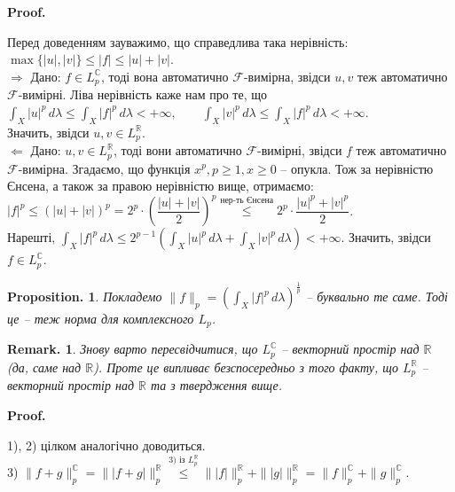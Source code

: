 \documentclass[a4paper, 10pt]{article}
\makeatletter
\def\rightproof{$\boxed{\Rightarrow}$ }
\def\leftproof{$\boxed{\Leftarrow}$ }
\theoremstyle{theoremdd}
\newtheorem*{proposition*}{Proposition.}
\newtheorem*{remark*}{Remark.}
\renewenvironment{proof}[1][Proof.\\]{\par
\pushQED{\hfill \qed}%
\normalfont \topsep6\p@\@plus6\p@\relax
\trivlist
\item\relax
{\bfseries
#1\@addpunct{.}}\hspace\labelsep\ignorespaces
}{%
\popQED\endtrivlist\@endpefalse
}
\makeatother
\begin{document}
\begin{proof}
Перед доведенням зауважимо, що справедлива така нерівність: $\max\{|u|,|v|\} \leq |f| \leq |u| + |v|$.
\bigskip \\
\rightproof Дано: $f \in L_p^{\mathbb{C}}$, тоді вона автоматично $\mathcal{F}$-вимірна, звідси $u,v$ теж автоматично $\mathcal{F}$-вимірні. Ліва нерівність каже нам про те, що\\
$\displaystyle\int_X |u|^p\,d\lambda \leq \int_X |f|^p\,d\lambda < +\infty, \qquad \int_X |v|^p\,d\lambda \leq \int_X |f|^p\,d\lambda < +\infty$.\\
Значить, звідси $u,v \in L_p^{\mathbb{R}}$.
\bigskip \\
\leftproof Дано: $u,v \in L_p^{\mathbb{R}}$, тоді вони автоматично $\mathcal{F}$-вимірні, звідси $f$ теж автоматично $\mathcal{F}$-вимірна. Згадаємо, що функція $x^p, p \geq 1,x \geq 0$ -- опукла. Тож за нерівністю Єнсена, а також за правою нерівністю вище, отримаємо:\\
$|f|^p \leq (|u| + |v|)^p = 2^p \cdot \left( \dfrac{|u| + |v|}{2} \right)^p \overset{\text{нер-ть Єнсена}}{\leq} 2^p \cdot \dfrac{|u|^p + |v|^p}{2}$.\\
Нарешті, $\displaystyle\int_X |f|^p\,d\lambda \leq 2^{p-1} \left( \int_X |u|^p\,d\lambda + \int_X |v|^p\,d\lambda \right) < +\infty$. Значить, звідси $f \in L_p^{\mathbb{C}}$.
\end{proof}

\begin{proposition*}
Покладемо $\|f\|_p = \displaystyle \left( \int_X |f|^p\,d\lambda \right)^{\frac{1}{p}}$ -- буквально те саме. Тоді це -- теж норма для комплексного $L_p$.
\end{proposition*}

\begin{remark*}
Знову варто пересвідчитися, що $L_p^{\mathbb{C}}$ -- векторний простір над $\mathbb{R}$ (да, саме над $\mathbb{R}$). Проте це випливає безспосередньо з того факту, що $L_p^{\mathbb{R}}$ -- векторний простір над $\mathbb{R}$ та з твердження вище.
\end{remark*}

\begin{proof}
1), 2) цілком аналогічно доводиться.\\
3) $\|f+g\|_p^{\mathbb{C}} = \| |f+g| \|_p^{\mathbb{R}} \overset{\text{3) із } L_p^{\mathbb{R}}}{\leq} \| |f| \|_p^{\mathbb{R}} + \| |g| \|_p^{\mathbb{R}} = \|f\|_p^{\mathbb{C}} + \|g\|_p^{\mathbb{C}}$.
\end{proof}
\end{document}
